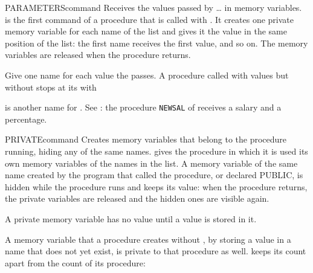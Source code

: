 \begin{XbaseEntry}{PARAMETERS}{command}
%
Receives the values passed by  \ldots{}  in memory variables.
\Syntax
{}
\Usage
{} is the first command of a procedure that is called with
.  It creates one private memory variable for each name of the list
and gives it the value in the same position of the  list: the first
name receives the first value, and so on.  The memory variables are released
when the procedure returns.

Give  one name for each value the  passes.  A procedure
called with values but without  stops at its  with

 is another name for .
\Examples
See : the procedure \texttt{NEWSAL} of  receives a salary
and a percentage.
\end{XbaseEntry}

\begin{XbaseEntry}{PRIVATE}{command}
Creates memory variables that belong to the procedure running, hiding any of
the same names.
\Syntax
{}
\Usage
{} gives the procedure in which it is used its own memory variables
of the names in the list.  A memory variable of the same name created by the
program that called the procedure, or declared PUBLIC, is hidden while the
procedure runs and keeps its value: when the procedure returns, the private
variables are released and the hidden ones are visible again.

A private memory variable has no value until a value is stored in it.

A memory variable that a procedure creates without , by storing a
value in a name that does not yet exist, is private to that procedure as well.
\Examples
{} keeps its count apart from the count of its procedure:
\end{XbaseEntry}

